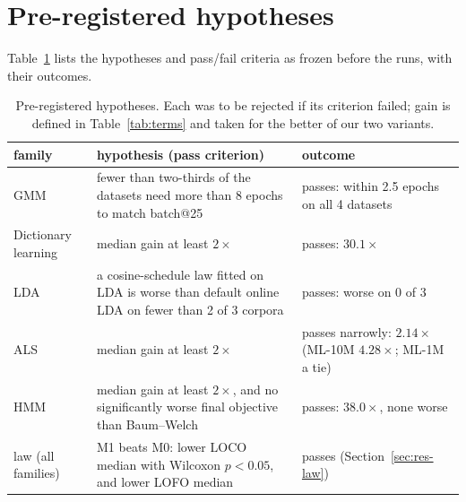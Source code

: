 \documentclass[10pt]{article}
\begin{document}
\section{Pre-registered hypotheses}\label{app:hyp}
Table~\ref{tab:hyp} lists the hypotheses and pass/fail criteria as frozen before the runs, with their outcomes.

\begin{table}[!htbp]
\centering\small
\caption{Pre-registered hypotheses. Each was to be rejected if its criterion failed; gain is defined in
Table~\ref{tab:terms} and taken for the better of our two variants.}\label{tab:hyp}
\begin{tabular}{p{1.7cm}p{6.6cm}p{6.0cm}}
\toprule
family & hypothesis (pass criterion) & outcome \\
\midrule
GMM & fewer than two-thirds of the datasets need more than 8 epochs to match batch@25 & passes: within 2.5 epochs
on all 4 datasets \\
Dictionary learning & median gain at least $2\times$ & passes: $30.1\times$ \\
LDA & a cosine-schedule law fitted on LDA is worse than default online LDA on fewer than 2 of 3 corpora & passes:
worse on 0 of 3 \\
ALS & median gain at least $2\times$ & passes narrowly: $2.14\times$ (ML-10M $4.28\times$; ML-1M a tie) \\
HMM & median gain at least $2\times$, and no significantly worse final objective than Baum--Welch & passes:
$38.0\times$, none worse \\
law (all families) & M1 beats M0: lower LOCO median with Wilcoxon $p < 0.05$, and lower LOFO median & passes
(Section~\ref{sec:res-law}) \\
\bottomrule
\end{tabular}
\end{table}
\end{document}
